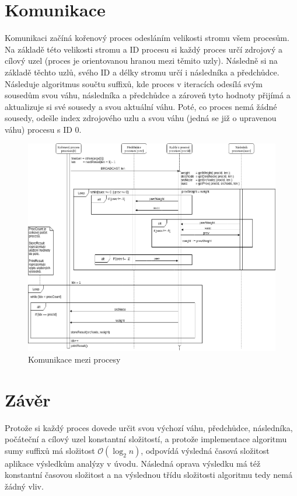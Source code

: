 \documentclass[11pt,a4paper,titlepage]{article}
\begin{document}
	\section{Komunikace}
        Komunikaci začíná kořenový proces odesláním velikosti stromu všem procesům. Na základě této velikosti stromu a ID procesu si každý
        proces určí zdrojový a cílový uzel (proces je orientovanou hranou mezi těmito uzly). Následně si na základě těchto uzlů, svého ID
        a délky stromu určí i následníka a předchůdce. Následuje algoritmus součtu suffixů, kde proces v iteracích odesílá svým sousedům
        svou váhu, následníka a předchůdce a zároveň tyto hodnoty přijímá a aktualizuje si své sousedy a svou aktuální váhu. Poté, co proces
        nemá žádné sousedy, odešle index zdrojového uzlu a svou váhu (jedná se již o upravenou váhu) procesu s ID 0.

        \begin{figure}[H]
            \includegraphics[width=1\linewidth]{sequenceDiagram.png}
            \caption{Komunikace mezi procesy}
        \end{figure}

	\section{Závěr}
        Protože si každý proces dovede určit svou výchozí váhu, předchůdce, následníka, počáteční a cílový uzel konstantní složitostí,
        a protože implementace algoritmu sumy suffixů má složitost $\mathcal{O}(\log_2 n)$, odpovídá výsledná časová složitost
        aplikace výsledkům analýzy v úvodu. Následná oprava výsledku má též konstantní časovou složitost a na výslednou třídu složitosti
        algoritmu tedy nemá žádný vliv.
\end{document}
